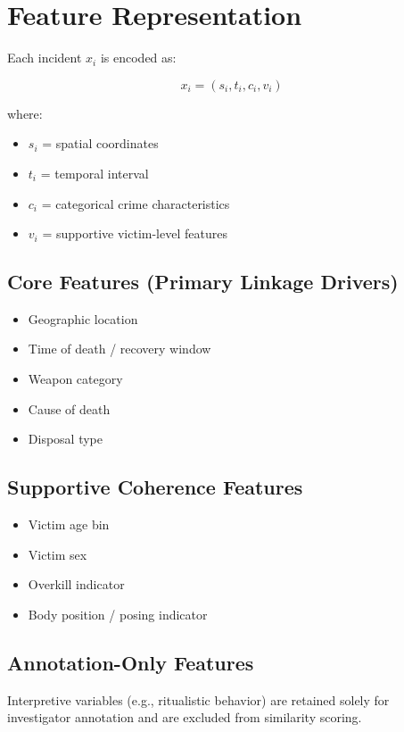 \documentclass[12pt]{article}
\begin{document}
\section{Feature Representation}

Each incident $x_i$ is encoded as:

\[
x_i = (s_i, t_i, c_i, v_i)
\]

where:
\begin{itemize}
    \item $s_i$ = spatial coordinates
    \item $t_i$ = temporal interval
    \item $c_i$ = categorical crime characteristics
    \item $v_i$ = supportive victim-level features
\end{itemize}

\subsection{Core Features (Primary Linkage Drivers)}
\begin{itemize}
    \item Geographic location
    \item Time of death / recovery window
    \item Weapon category
    \item Cause of death
    \item Disposal type
\end{itemize}

\subsection{Supportive Coherence Features}
\begin{itemize}
    \item Victim age bin
    \item Victim sex
    \item Overkill indicator
    \item Body position / posing indicator
\end{itemize}

\subsection{Annotation-Only Features}
Interpretive variables (e.g., ritualistic behavior) are retained solely for investigator annotation and are excluded from similarity scoring.
\end{document}

